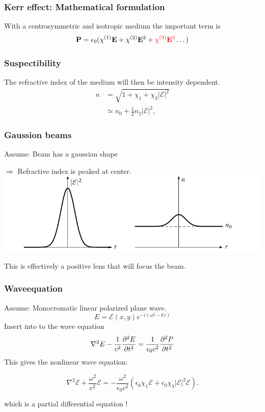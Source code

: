\begin{frame}
  \frametitle{Kerr effect: Mathematical formulation}

  With a centrosymmetric and isotropic medium the important term is
  \[
  \mathbf P = \epsilon_0 ( \chi^{\textup{(1)}} \mathbf E +
  {\chi^{\textup{(2)}} \mathbf E^2} + \textcolor{red}{\chi^{\textup{(3)}} \mathbf E^3} \dots )
  \]
\end{frame}

\begin{frame}
  \frametitle{Suspectibility}

  The refractive index of the medium will then be intensity dependent. 
  \begin{align*}
    n &= \sqrt{1 + \chi_1 + \chi_3 |\mathcal{E}|^2}\\
    &\simeq n_0 + \tfrac{1}{2} n_2 |\mathcal{E}|^2,
  \end{align*}
\end{frame}

\begin{frame}
  \frametitle{Gaussion beams}
  Assume: Beam has a gaussian shape

  $\Rightarrow$ Refractive index is peaked at center.
  {\centering
  \includegraphics[width=1\columnwidth]{gaussrefrac}}

This is effectively a positive lens that will focus the beam. 
\end{frame}

\begin{frame}
  \frametitle{Waveequation}
  Assume: Monocromatic linear polarized plane wave.
  \[E = \mathcal{E}(x,y) e^{-i (\omega t-kz)}\]
  Insert into to the wave equation
\[  \nabla^2 E - \frac{1}{c^2} \frac{\partial^2 E}{\partial t^2}
  = \frac{1}{\epsilon_0c^2} \frac{\partial^2 P}{\partial t^2}\]
  This gives the nonlinear wave equation:

  \[\nabla^2 \mathcal{E} + \frac{\omega^{2}}{c^2} \mathcal{E} = - \frac{\omega^2}{\epsilon_0 c^2} \left( \epsilon_0 \chi_1
    \mathcal{E} + \epsilon_0 \chi_3 |\mathcal{E}|^2 \mathcal{E}
  \right).\]

  which is a partial differential equation !
\end{frame}



